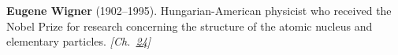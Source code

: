 \nobelphysics \textbf{Eugene Wigner} (1902–1995). Hungarian-American physicist who received the Nobel Prize for research concerning the structure of the atomic nucleus and elementary particles. \emph{[Ch.~\hyperref[ch:4dspacetime]{24}]}

